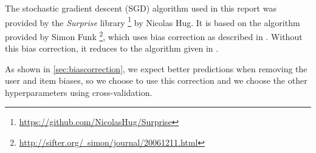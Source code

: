 The stochastic gradient descent (SGD) algorithm used in this report was provided by the
\textit{Surprise} library
\footnote{\href{}{https://github.com/NicolasHug/Surprise}} by Nicolas Hug.  
It is based on the algorithm provided by  
Simon Funk \footnote{\href{}{http://sifter.org/~simon/journal/20061211.html}}, 
which uses bias correction as described in \cite{Koren2009}. 
Without this bias correction, it reduces to the algorithm given in \cite{Salak2008}. 

As shown in \ref{sec:biascorrection}, we expect better predictions when removing
the user and item biases, so we choose to use this correction and we choose the
other hyperparameters using cross-validation.


